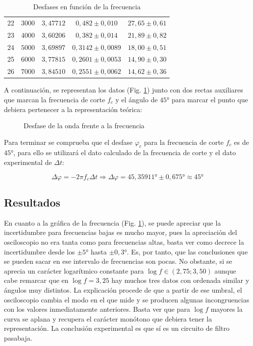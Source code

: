 \documentclass[11pt]{report}
\begin{document}
\begin{refsection}
\begin{table}[H]
\begin{tabular}{|c|c|c|c|c|}
22 & $3000$ & $3,47712$ & $0,482 \pm 0,010$ & $27,65 \pm 0,61$ \\
23 & $4000$ & $3,60206$ & $0,382 \pm 0,014$ & $21,89 \pm 0,82$ \\
24 & $5000$ & $3,69897$ & $0,3142 \pm 0,0089$ & $18,00 \pm 0,51$ \\
25 & $6000$ & $3,77815$ & $0,2601 \pm 0,0053$ & $14,90 \pm 0,30$ \\
26 & $7000$ & $3,84510$ & $0,2551 \pm 0,0062$ & $14,62 \pm 0,36$ \\
\hline
\end{tabular}
\caption{Desfases en función de la frecuencia}
\label{tab:desfases}
\end{table}

A continuación, se representan los datos (Fig. \ref{fig:ddoff}) junto con dos rectas auxiliares que marcan la frecuencia de corte $f_c$ y el ángulo
de $45\unit{\degree}$ para marcar el punto que debiera pertenecer a la representación teórica:

\begin{figure}[H]
    \begin{center}
        
    \end{center}
    \caption{Desfase de la onda frente a la frecuencia}
    \label{fig:ddoff}
\end{figure}

Para terminar se comprueba que el desfase $\varphi_c$ para la frecuencia de corte $f_c$ es de $45\unit{\degree}$, para ello se utilizará el dato
calculado de la frecuencia de corte y el dato experimental de $\Delta t$:

\begin{equation}
    \Delta \varphi=-2\pi f_c\Delta t \Rightarrow \Delta \varphi=45,35911\unit{\degree}\pm 0,675\unit{\degree} \approx 45\unit{\degree}
\end{equation}

\subsection{Resultados}

En cuanto a la gráfica de la frecuencia (Fig. \ref{fig:ddoff}), se puede apreciar que la incertidumbre para frecuencias bajas es mucho
mayor, pues la apreciación del osciloscopio no era tanta como para frecuencias altas, basta ver como decrece la incertidumbre desde
los $\pm 5\unit{\degree}$ hasta $\pm 0,3\unit{\degree}$. Es, por tanto, que las conclusiones que se pueden sacar en ese intervalo de 
frecuencias son pocas. No obstante, si se aprecia un carácter logarítmico constante para $\log f \in(2,75;3,50)$ aunque cabe remarcar 
que en $\log f= 3,25$ hay muchos tres datos con ordenada similar y ángulos muy distintos. La explicación procede de que a partir de
ese umbral, el osciloscopio cambia el modo en el que mide y se producen algunas incongruencias con los valores inmediatamente anteriores.
Basta ver que para $\log f$ mayores la curva se aplana y recupera el carácter monótono que debiera tener la representación. La conclusión
experimental es que sí es un circuito de filtro pasabaja.


\end{refsection}
\end{document}
